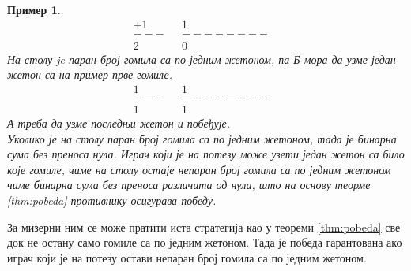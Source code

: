 \documentclass[a4paper]{article}
\newtheorem{example}{Пример}
\begin{document}
\begin{example}
\begin{align*}
			+1&		&  	  	1&\\
			---&	&--------&\\
			2&		&       0
		\end{align*}
	На столу je паран број гомила са по једним жетоном, па \textit{Б} мора да узме један жетон са на пример прве гомиле.
		\begin{align*}
			1&		&  	  	1&\\
			---&	&--------&\\
			1&		&       1
		\end{align*}
	\textit{А} треба да узме последњи жетон и побеђује.\\
	Уколико је на столу паран број гомила са по једним жетоном, тада је бинарна сума без преноса нула. Играч који је на потезу може узети један жетон са било које гомиле, чиме на столу остаје непаран број гомила са по једним жетоном чиме бинарна сума без преноса различита од нула, што на основу теорме \ref{thm:pobeda} противнику осигурава победу.
\end{example}

За мизерни ним се може пратити иста стратегија као у теореми \ref{thm:pobeda} све док не остану само гомиле са по једним жетоном. Тада је победа гарантована ако играч који је на потезу остави непаран број гомила са по једним жетоном.
\end{document}
